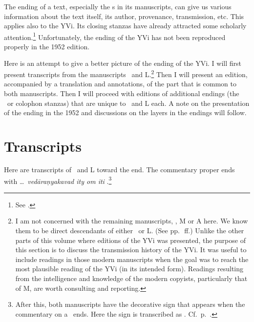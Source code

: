 The ending of a text, especially the \colophon s in its manuscripts, can give us various information about the text itself, its author, provenance, transmission, etc. This applies also to the YVi. Its closing stanzas have already attracted some scholarly attention.\footnote{See \citet[420]{rukmani:yoga1}.}
Unfortunately, the ending of the YVi has not been reproduced properly in the 1952 edition. %

Here is an attempt to give a better picture of the ending of the YVi. I will first present transcripts from the manuscripts \Tm\ and L\@.\footnote{I am not concerned with the remaining manuscripts, \Td, M or A here. We know them to be direct descendants of either \Tm\ or L\@. (See pp.~\pageref{sec:stemma}\,ff.) Unlike the other parts of this volume where editions of the YVi was presented, the purpose of this section is to discuss the transmission history of the YVi. It was useful to include readings in those modern manuscripts when the goal was to reach the most plausible reading of the YVi (in its intended form). Readings resulting from the intelligence and knowledge of the modern copyists, particularly that of M, are worth consulting and reporting.} Then I will present an edition, accompanied by a translation and annotations, of the part that is common to both manuscripts. Then I will proceed with editions of additional endings (the \colophon\ or colophon stanzas) that are unique to \Tm\ and L each. A note on the presentation of the ending in the 1952 and discussions on the layers in the endings will follow. 

\section{Transcripts}
Here are transcripts of \Tm\ and L toward the end. The commentary proper ends with \ldots\ \emph{vedāraṇyakavad ity om iti} \citep[369]{yvi}.\footnote{After this, both manuscripts have the decorative sign that appears when the commentary on a \sutra\ ends. Here the sign is transcribed as . Cf.~p.~\pageref{punctuation}.} 

